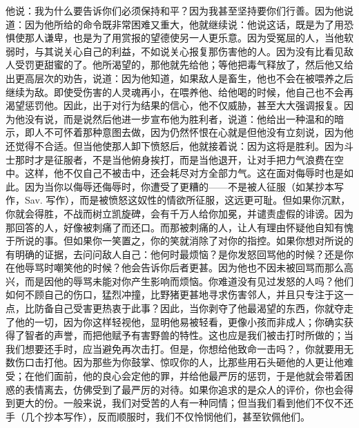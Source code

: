 他说：我为什么要告诉你们必须保持和平？因为我甚至坚持要你们行善。因为他说道：因为他所给的命令既非常困难又重大，他就继续说：他说这话，既是为了用恐惧使那人谦卑，也是为了用赏报的望德使另一人更乐意。因为受冤屈的人，当他软弱时，与其说关心自己的利益，不如说关心报复那伤害他的人。因为没有比看见敌人受罚更甜蜜的了。他所渴望的，那他就先给他；等他把毒气释放了，然后他又给出更高层次的劝告，说道：因为他知道，如果敌人是畜生，他也不会在被喂养之后继续为敌。即使受伤害的人灵魂再小，在喂养他、给他喝的时候，他自己也不会再渴望惩罚他。因此，出于对行为结果的信心，他不仅威胁，甚至大大强调报复。因为他没有说，而是说然后他进一步宣布他为胜利者，说道：他给出一种温和的暗示，即人不可怀着那种意图去做，因为仍然怀恨在心就是但他没有立刻说，因为他还觉得不合适。但当他使那人卸下愤怒后，他就接着说：因为这将是胜利。因为斗士那时才是征服者，不是当他俯身挨打，而是当他退开，让对手把力气浪费在空中。这样，他不仅自己不被击中，还会耗尽对方全部力气。这在面对侮辱时也是如此。因为当你以侮辱还侮辱时，你遭受了更糟的——不是被人征服（如某抄本写作，Sav. 写作），而是被愤怒这奴性的情欲所征服，这远更可耻。但如果你沉默，你就会得胜，不战而树立凯旋碑，会有千万人给你加冕，并谴责虚假的诽谤。因为那回答的人，好像被刺痛了而还口。而那被刺痛的人，让人有理由怀疑他自知有愧于所说的事。但如果你一笑置之，你的笑就消除了对你的指控。如果你想对所说的有明确的证据，去问问敌人自己：他何时最烦恼？是你发怒回骂他的时候？还是你在他辱骂时嘲笑他的时候？他会告诉你后者更甚。因为他也不因未被回骂而那么高兴，而是因他的辱骂未能对你产生影响而烦恼。你难道没有见过发怒的人吗？他们如何不顾自己的伤口，猛烈冲撞，比野猪更甚地寻求伤害邻人，并且只专注于这一点，比防备自己受害更热衷于此事？因此，当你剥夺了他最渴望的东西，你就夺走了他的一切，因为你这样轻视他，显明他易被轻看，更像小孩而非成人；你确实获得了智者的声誉，而把他赋予有害野兽的特性。这也应是我们被击打时所做的；当我们想要还手时，应当避免再次击打。但是，你想给他致命一击吗？，你就要用无数伤口击打他。因为那些为你鼓掌、惊叹你的人，比那些用石头砸他的人更让他难受；在他们面前，他的良心会定他的罪，并给他最严厉的惩罚，于是他就会带着困惑的表情离去，仿佛受到了最严厉的对待。如果你追求的是众人的评价，你也会得到更大的份。一般来说，我们对受苦的人有一种同情；但当我们看到他们不仅不还手（几个抄本写作），反而顺服时，我们不仅怜悯他们，甚至钦佩他们。\par

